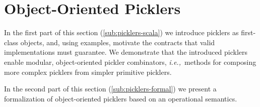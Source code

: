 \documentclass[10pt]{sigplanconf}
\theoremstyle{definition}
\theoremstyle{definition}
\newcommand{\ie}{{\em i.e.,~}}
\newcommand{\ba}{\begin{array}}
\newcommand{\ea}{\end{array}}
\begin{document}



\section{Object-Oriented Picklers}\label{sec:oopicklers}

In the first part of this section (\ref{sub:picklers-scala}) we introduce
picklers as first-class objects, and, using examples, motivate the contracts
that valid implementations must guarantee. We demonstrate that the introduced
picklers enable modular, object-oriented pickler combinators, \ie methods for
composing more complex picklers from simpler primitive picklers.

In the second part of this section (\ref{sub:picklers-formal}) we present a
formalization of object-oriented picklers based on an operational semantics.
\end{document}
